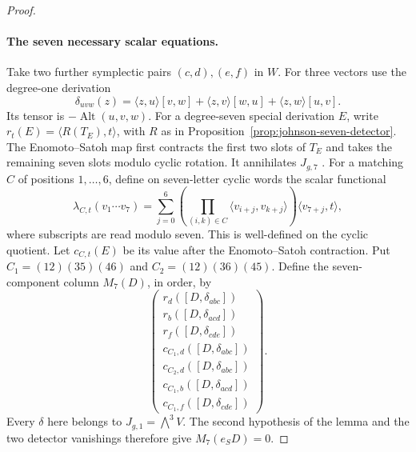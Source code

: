 \begin{proof}
\paragraph{The seven necessary scalar equations.}
Take two further symplectic pairs $(c,d),(e,f)$ in $W$.
For three vectors use the degree-one derivation
\[
 \delta_{uvw}(z)=\langle z,u\rangle[v,w]
          +\langle z,v\rangle[w,u]
          +\langle z,w\rangle[u,v].
\]
Its tensor is $-\operatorname{Alt}(u,v,w)$.
For a degree-seven special derivation $E$, write
$r_t(E)=\langle R(T_E),t\rangle$, with $R$ as in
Proposition~\ref{prop:johnson-seven-detector}.
The Enomoto--Satoh map first contracts the first two
slots of $T_E$ and takes the remaining seven slots
modulo cyclic rotation. It annihilates $J_{g,7}$
\cite[diagram (2), p.~640; \S7.1, p.~656]{EnomotoSatoh2014}.
For a matching $C$ of positions $1,\ldots,6$, define
on seven-letter cyclic words the scalar functional
\[
 \lambda_{C,t}(v_1\cdots v_7)
  =\sum_{j=0}^6
       \left(\prod_{(i,k)\in C}
          \langle v_{i+j},v_{k+j}\rangle\right)
                 \langle v_{7+j},t\rangle,
\]
where subscripts are read modulo seven. This is
well-defined on the cyclic quotient. Let $c_{C,t}(E)$
be its value after the Enomoto--Satoh contraction.
Put $C_1=(12)(35)(46)$ and $C_2=(12)(36)(45)$.
Define the seven-component column $M_7(D)$, in order, by
\[
\begin{pmatrix}
r_d([D,\delta_{abc}])\\
r_b([D,\delta_{acd}])\\
r_f([D,\delta_{cde}])\\
c_{C_1,d}([D,\delta_{abc}])\\
c_{C_2,d}([D,\delta_{abc}])\\
c_{C_1,b}([D,\delta_{acd}])\\
c_{C_1,f}([D,\delta_{cde}])
\end{pmatrix}.
\]
Every $\delta$ here belongs to $J_{g,1}=\bigwedge^3V$.
The second hypothesis of the lemma and the two detector
vanishings therefore give $M_7(e_SD)=0$.


\end{proof}
